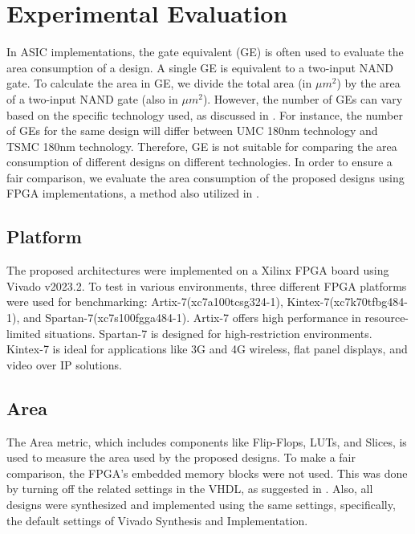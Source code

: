 \documentclass[final,5p,times,twocolumn]{elsarticle}
\begin{document}
\section{Experimental Evaluation}\label{sec4}

In ASIC implementations, the gate equivalent (GE) is often used to evaluate the area consumption of a design.
A single GE is equivalent to a two-input NAND gate.
To calculate the area in GE, we divide the total area (in $\mu m^2$) by the area of a two-input NAND gate (also in $\mu m^2$).
However, the number of GEs can vary based on the specific technology used, as discussed in \cite{mckay2016report}.
For instance, the number of GEs for the same design will differ between UMC 180nm technology and TSMC 180nm technology.
Therefore, GE is not suitable for comparing the area consumption of different designs on different technologies.
In order to ensure a fair comparison, we evaluate the area consumption of the proposed designs using FPGA implementations, a method also utilized in \cite{mohajerani2020fpga}.

\subsection{Platform}\label{subsec4}

The proposed architectures were implemented on a Xilinx FPGA board using Vivado v2023.2. To test in various environments, three different FPGA platforms were used for benchmarking: Artix-7(xc7a100tcsg324-1), Kintex-7(xc7k70tfbg484-1), and Spartan-7(xc7s100fgga484-1).
Artix-7 offers high performance in resource-limited situations. Spartan-7 is designed for high-restriction environments. Kintex-7 is ideal for applications like 3G and 4G wireless, flat panel displays, and video over IP solutions.


\subsection{Area}\label{subsec5}

The Area metric, which includes components like Flip-Flops, LUTs, and Slices, is used to measure the area used by the proposed designs. To make a fair comparison, the FPGA's embedded memory blocks were not used. This was done by turning off the related settings in the VHDL, as suggested in \cite{xilinx2022ultrafast}. Also, all designs were synthesized and implemented using the same settings, specifically, the default settings of Vivado Synthesis and Implementation.
\end{document}
